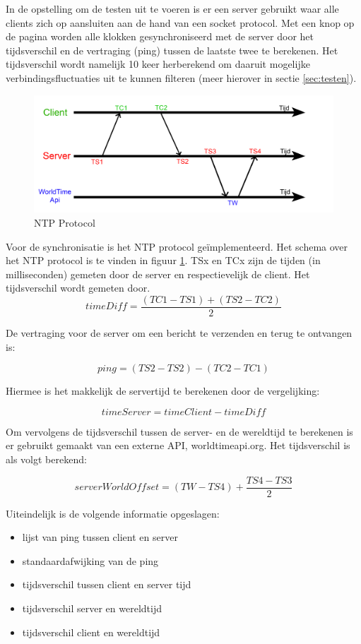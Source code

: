 In de opstelling om de testen uit te voeren is er een server gebruikt waar alle clients zich op aansluiten aan de hand van een socket protocol. Met een knop op de pagina worden alle klokken gesynchroniseerd met de server door het tijdsverschil en de vertraging (ping) tussen de laatste twee te berekenen.
Het tijdsverschil wordt namelijk 10 keer herberekend om daaruit mogelijke verbindingsfluctuaties uit te kunnen filteren (meer hierover in sectie \ref{sec:testen}).

\begin{figure}[h]
\centering
\includegraphics[scale=0.4]{img/server-client-sync.jpg}
\caption{NTP Protocol} \label{serv-client}
\end{figure}

Voor de synchronisatie is het NTP protocol geïmplementeerd. \cite{NTP:1}
Het schema over het NTP protocol is te vinden in figuur \ref{serv-client}. TSx en TCx zijn de tijden (in milliseconden) gemeten door de server en respectievelijk de client.
Het tijdsverschil wordt gemeten door.
\newline
\[ timeDiff = \frac{(TC1 - TS1) + (TS2 - TC2)}{2}  \]

De vertraging voor de server om een bericht te verzenden en terug te ontvangen is:

\[ ping  = (TS2 - TS2) - (TC2 - TC1) \]


Hiermee is het makkelijk de servertijd te berekenen door de vergelijking:

\[ timeServer = timeClient - timeDiff \]

Om vervolgens de tijdsverschil tussen de server- en de wereldtijd te berekenen is er gebruikt gemaakt van een externe API, worldtimeapi.org. Het tijdsverschil is als volgt berekend:

\[ serverWorldOffset = (TW - TS4) + \frac{TS4 - TS3}{2} \]

Uiteindelijk is de volgende informatie opgeslagen:

\begin{itemize}
  \item lijst van ping tussen client en server
  \item standaardafwijking van de ping
  \item tijdsverschil tussen client en server tijd
  \item tijdsverschil server en wereldtijd
  \item tijdsverschil client en wereldtijd
\end{itemize}




